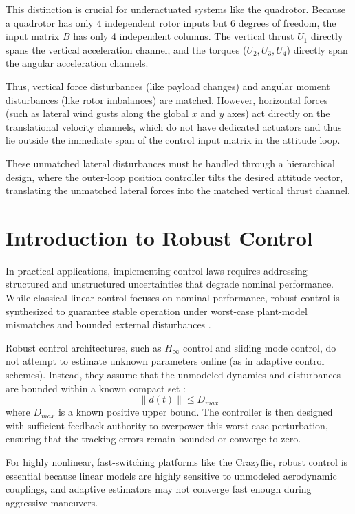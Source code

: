 This distinction is crucial for underactuated systems like the quadrotor. Because a quadrotor has only 4 independent rotor inputs but 6 degrees of freedom, the input matrix $B$ has only 4 independent columns. The vertical thrust $U_1$ directly spans the vertical acceleration channel, and the torques ($U_2, U_3, U_4$) directly span the angular acceleration channels. 

Thus, vertical force disturbances (like payload changes) and angular moment disturbances (like rotor imbalances) are matched. However, horizontal forces (such as lateral wind gusts along the global $x$ and $y$ axes) act directly on the translational velocity channels, which do not have dedicated actuators and thus lie outside the immediate span of the control input matrix in the attitude loop. 

These unmatched lateral disturbances must be handled through a hierarchical design, where the outer-loop position controller tilts the desired attitude vector, translating the unmatched lateral forces into the matched vertical thrust channel.

\section{Introduction to Robust Control}
In practical applications, implementing control laws requires addressing structured and unstructured uncertainties that degrade nominal performance. While classical linear control focuses on nominal performance, robust control is synthesized to guarantee stable operation under worst-case plant-model mismatches and bounded external disturbances \cite{ref_64}.

Robust control architectures, such as $H_{\infty}$ control and sliding mode control, do not attempt to estimate unknown parameters online (as in adaptive control schemes). Instead, they assume that the unmodeled dynamics and disturbances are bounded within a known compact set \cite{ref_64, ref_66}:
\begin{equation}
\|d(t)\| \leq D_{max}
\end{equation}
where $D_{max}$ is a known positive upper bound. The controller is then designed with sufficient feedback authority to overpower this worst-case perturbation, ensuring that the tracking errors remain bounded or converge to zero. 

For highly nonlinear, fast-switching platforms like the Crazyflie, robust control is essential because linear models are highly sensitive to unmodeled aerodynamic couplings, and adaptive estimators may not converge fast enough during aggressive maneuvers.

